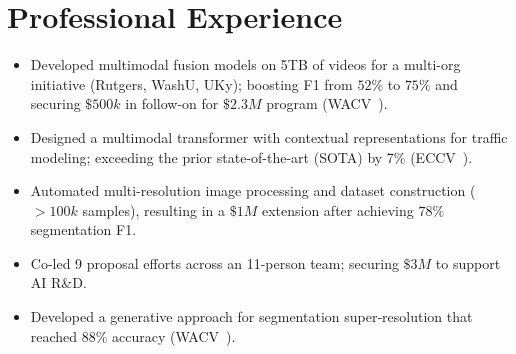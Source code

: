\documentclass[11pt,a4paper,sans]{moderncv} %
\begin{document}
\makecvtitle %
\vspace*{-1.5cm}



\section{Professional Experience}
{
\begin{itemize}
	\item Developed multimodal fusion models on 5TB of videos for a multi-org initiative (Rutgers, WashU, UKy); boosting F1 from $52\%$ to $75\%$ and securing $\$500k$ in follow-on for $\$2.3M$ program (WACV~\cite{greenwell2024watch}).
	\item Designed a multimodal transformer with contextual representations for traffic modeling; exceeding the prior state-of-the-art (SOTA) by 7\% (ECCV~\cite{ProbTraffic}).
	\item Automated multi-resolution image processing and dataset construction ($>100k$ samples), resulting in a $\$1M$ extension after achieving $78\%$ segmentation F1.
	\item Co-led 9 proposal efforts across an 11-person team; securing $\$3M$ to support AI R\&D.
	\item Developed a generative approach for segmentation super‑resolution that reached $88\%$ accuracy (WACV~\cite{Low2High}).
\end{itemize}
}

\end{document}
